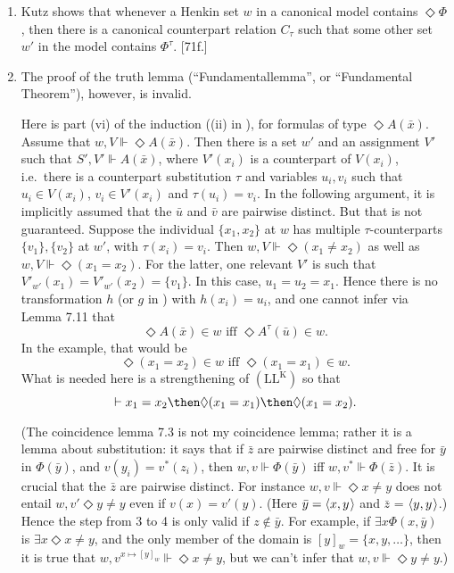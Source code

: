 \documentclass[11pt]{woarticle}
\theoremstyle{break}
\theoremstyle{nonumberplain}
\newcommand{\SAT}{\Vdash}
\newcommand{\1}{\;\,|\;\,}
\renewcommand{\t}[1]{\ensuremath{\langle #1  \makebox[.2ex]{}\rangle}}
\newcommand{\T}[1]{\ensuremath{(\mathrm{ #1})}}
\begin{document}
{\begin{enumerate}
  Here the worry arises that $\Fr{C}$ might contain a counterpart
  relation $C$ such that $w \xrightarrow{C_\tau} w'$ although $w'$
  does \emph{not} contain $\Phi^\tau$ whenever $w$ contains $\Box
  \Phi$, where $C_\tau$ got into $\Fr{C}$ by linking some other worlds
  $v,v'$ with the same individuals.

\item Kutz shows that whenever a Henkin set $w$ in a canonical model
  contains $\Diamond \Phi$, then there is a canonical counterpart
  relation $C_\tau$ such that some other set $w'$ in the model
  contains $\Phi^\tau$. [71f.]

\item The proof of the truth lemma (``Fundamentallemma'', or
  ``Fundamental Theorem''), however, is invalid.

  Here is part (vi) of the induction ((ii) in
  ), for formulas of type $\Diamond
  A(\bar{x})$. Assume that $w,V \SAT \Diamond A(\bar{x})$. Then there
  is a set $w'$ and an assignment $V'$ such that $S',V' \SAT
  A(\bar{x})$, where $V'(x_i)$ is a counterpart of $V(x_i)$, i.e.\
  there is a counterpart substitution $\tau$ and variables $u_i, v_i$
  such that $u_i \in V(x_i)$, $v_i \in V'(x_i)$ and $\tau(u_i) =
  v_i$. In the following argument, it is implicitly assumed that the
  $\bar{u}$ and $\bar{v}$ are pairwise distinct. But that is not
  guaranteed. Suppose the individual $\{x_1, x_2\}$ at $w$ has
  multiple $\tau$-counterparts $\{v_1\}, \{ v_2 \}$ at $w'$, with
  $\tau(x_i)=v_i$. Then $w,V \SAT \Diamond(x_1\!\not=\!x_2)$ as well
  as $w,V \SAT \Diamond(x_1 = x_2)$. For the latter, one relevant $V'$
  is such that $V'_{w'}(x_1) = V'_{w'}(x_2) = \{ v_1 \}$. In this
  case, $u_1 = u_2 = x_1$. Hence there is no transformation $h$ (or
  $g$ in \citey[14]{kracht02semantics}) with $h(x_i) = u_i$, and one
  cannot infer via Lemma 7.11 that
  \[
  \Diamond A(\bar{x}) \in w \text{ iff } \Diamond A^\tau(\bar{u}) \in w.
  \]
  In the example, that would be
  \[
  \Diamond(x_1 = x_2) \in w \text{ iff } \Diamond(x_1 = x_1) \in w.
  \]
  What is needed here is a strengthening of \T{LL^K} so that
  \[
  \vdash x_1 = x_2 \then \Diamond(x_1 = x_1) \then \Diamond(x_1 = x_2).
  \]

  (The coincidence lemma 7.3 is not my coincidence lemma; rather it is
  a lemma about substitution: it says that if $\bar{z}$ are pairwise
  distinct and free for $\bar{y}$ in $\Phi(\bar{y})$, and
  $v(y_i)=v^*(z_i)$, then $w,v \SAT \Phi(\bar{y})$ iff $w,v^* \SAT
  \Phi(\bar{z})$. It is crucial that the $\bar{z}$ are pairwise
  distinct. For instance $w,v \SAT \Diamond x\!\not=\!y$ does not
  entail $w,v' \Diamond y\!\not=\!y$ even if $v(x)=v'(y)$. (Here
  $\bar{y} = \t{x,y}$ and $\bar{z}$ = $\t{y,y}$.) Hence the step from
  3 to 4 is only valid if $z \not\in \bar{y}$. For example, if
  $\exists x \Phi(x,\bar{y})$ is $\exists x\Diamond x\!\not=\!y$, and
  the only member of the domain is $[y]_w = \{ x,y,\ldots \}$, then it
  is true that $w,v^{x\mapsto [y]_w} \SAT \Diamond x\!\not=\!y$, but
  we can't infer that $w,v \SAT \Diamond y\!\not=\!y$.)


\end{enumerate}}
\end{document}

